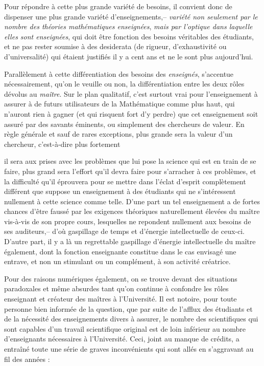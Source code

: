 \documentclass[11pt,a4paper]{article}
\begin{document}
Pour répondre à cette plus grande variété de besoins, il convient
donc de dispenser une plus grande variété d'enseignements,-- \emph{variété non
seulement par le nombre des théories mathématiques enseignées}, \emph{mais par l'optique
dans laquelle elles sont enseignées}, qui doit être fonction des besoins
véritables des étudiants, et ne pas rester soumise à des desiderata (de
rigueur, d'exhaustivité ou d'universalité) qui étaient justifiés il y a cent
ans et ne le sont plus aujourd'hui.

Parallèlement à cette différentiation des besoins des \emph{enseignés},
s'accentue nécessairement, qu'on le veuille ou non, la différentiation entre
les deux rôles dévolus au \emph{maître}. Sur le plan qualitatif, c'est surtout
vrai pour l'enseignement à assurer à de futurs utilisateurs de la
Mathématique comme plus haut, qui n'auront rien à gagner (et qui risquent fort d'y
perdre) que cet enseignement soit assuré par des savants éminents, ou
simplement des chercheurs de valeur. En règle générale et sauf de rares
exceptions, plus grande sera la valeur d'un chercheur, c'est-à-dire plus fortement

il sera aux prises avec les problèmes que lui pose la science qui est en train
de se faire, plus grand sera l'effort qu'il devra faire pour s'arracher à ces
problèmes, et la difficulté qu'il éprouvera pour se mettre dans l'éclat
d'esprit complètement différent que suppose un enseignement à des étudiants qui
ne s'intéressent nullement à cette science comme telle. D'une part un tel
enseignement a de fortes chances d'être faussé par les exigences théoriques
naturellement élevées du maître vis-à-vis de son propre cours, lesquelles
ne repondent nullement aux besoins de ses auditeurs,-- d'où gaspillage de
temps et d'énergie intellectuelle de ceux-ci. D'autre part, il y a là un
regrettable gaspillage d'énergie intellectuelle du maître également, dont
la fonction enseignante constitue dans le cas envisagé une entrave, et non
un stimulant ou un complément, à son activité créatrice.

Pour des raisons numériques également, on se trouve devant des
situations paradoxales et même absurdes tant qu'on continue à confondre les
rôles enseignant et créateur des maîtres à l'Université. Il est notoire,
pour toute personne bien informée de la question, que par suite de l'afflux
des étudiants et de la nécessité des enseignements divers à assurer, le
nombre des scientifiques qui sont capables d'un travail scientifique original
est de loin inférieur au nombre d'enseignants nécessaires à l'Université.
Ceci, joint au manque de crédits, a entraîné toute une série de graves
inconvénients qui sont allés en s'aggravant au fil des années :
\end{document}
